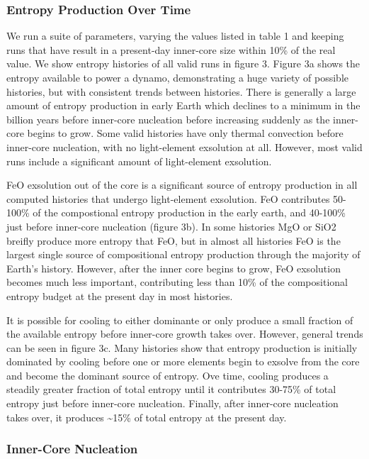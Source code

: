 \documentclass[]{article}
\begin{document}
\hypertarget{entropy-production-over-time}{%
\subsubsection{Entropy Production Over
Time}\label{entropy-production-over-time}}

We run a suite of parameters, varying the values listed in table 1 and
keeping runs that have result in a present-day inner-core size within
10\% of the real value. We show entropy histories of all valid runs in
figure 3. Figure 3a shows the entropy available to power a dynamo,
demonstrating a huge variety of possible histories, but with consistent
trends between histories. There is generally a large amount of entropy
production in early Earth which declines to a minimum in the billion
years before inner-core nucleation before increasing suddenly as the
inner-core begins to grow. Some valid histories have only thermal
convection before inner-core nucleation, with no light-element
exsolution at all. However, most valid runs include a significant amount
of light-element exsolution.

FeO exsolution out of the core is a significant source of entropy
production in all computed histories that undergo light-element
exsolution. FeO contributes 50-100\% of the compostional entropy
production in the early earth, and 40-100\% just before inner-core
nucleation (figure 3b). In some histories MgO or SiO2 breifly produce
more entropy that FeO, but in almost all histories FeO is the largest
single source of compositional entropy production through the majority
of Earth's history. However, after the inner core begins to grow, FeO
exsolution becomes much less important, contributing less than 10\% of
the compositional entropy budget at the present day in most histories.

It is possible for cooling to either dominante or only produce a small
fraction of the available entropy before inner-core growth takes over.
However, general trends can be seen in figure 3c. Many histories show
that entropy production is initially dominated by cooling before one or
more elements begin to exsolve from the core and become the dominant
source of entropy. Ove time, cooling produces a steadily greater
fraction of total entropy until it contributes 30-75\% of total entropy
just before inner-core nucleation. Finally, after inner-core nucleation
takes over, it produces \textasciitilde{}15\% of total entropy at the
present day.

\hypertarget{inner-core-nucleation}{%
\subsubsection{Inner-Core Nucleation}\label{inner-core-nucleation}}
\end{document}
